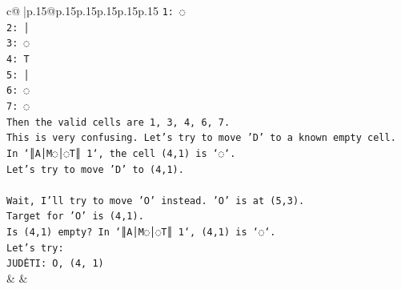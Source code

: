 \documentclass{article}
\begin{document}
{\begin{supertabular}{c@{$\;$}|p{.15\linewidth}@{}p{.15\linewidth}p{.15\linewidth}p{.15\linewidth}p{.15\linewidth}p{.15\linewidth}}
{{{\texttt{1: ◌} \\
\texttt{2: │} \\
\texttt{3: ◌} \\
\texttt{4: T} \\
\texttt{5: │} \\
\texttt{6: ◌} \\
\texttt{7: ◌} \\
\texttt{Then the valid cells are 1, 3, 4, 6, 7.} \\
\texttt{This is very confusing. Let's try to move 'D' to a known empty cell.} \\
\texttt{In `║A│M◌│◌T║ 1`, the cell (4,1) is `◌`.} \\
\texttt{Let's try to move 'D' to (4,1).} \\
\\ 
\texttt{Wait, I'll try to move 'O' instead. 'O' is at (5,3).} \\
\texttt{Target for 'O' is (4,1).} \\
\texttt{Is (4,1) empty? In `║A│M◌│◌T║ 1`, (4,1) is `◌`.} \\
\texttt{Let's try:} \\
\texttt{JUDĖTI: O, (4, 1)} \\
            }
        }
    }
    & & \\ \\


\end{supertabular}}
\end{document}
